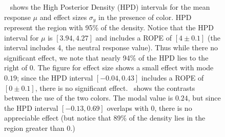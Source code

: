 \begin{figure}
  \hfill
 \caption{~ shows the High Posterior Density (HPD) intervals for the mean response $\mu$ and effect sizes $\sigma_y$ in the presence of color. HPD represent the region with 95\% of the density. Notice that the HPD interval for $\mu$ is $[3.94, 4.27]$ and includes a ROPE of $[4\pm 0.1]$ (the interval includes 4, the neutral response value). Thus while there no significant effect, we note that nearly 94\% of the HPD lies to the right of 0. The figure for effect size shows a small effect with mode $0.19$; since the HPD interval $[-0.04, 0.43]$ includes a ROPE of $[0\pm 0.1]$, there is no significant effect.~ shows the contrasts between the use of the two colors. The modal value is $0.24$, but since the HPD interval $[-0.13, 0.69]$ overlaps with 0, there is no appreciable effect (but notice that 89\% of the density lies in the region greater than 0.)}
 \label{fig:color-experiment-effect}
\end{figure}


